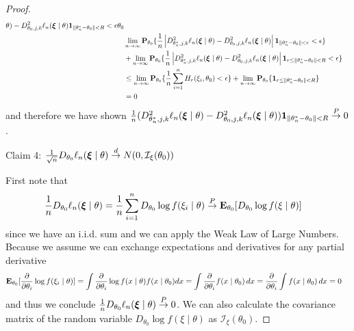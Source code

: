 \begin{proof}
\begin{align*}
{{\theta) - D^2_{\theta_0, j,k} \ell_n(\sample{\xi} \mid
\theta) } \characteristic{\norm{\theta^*_n - \theta_0} < R} <
\epsilon}{\theta_0} \\
&\lim_{n \to \infty} \sprobability{\frac{1}{n}\abs{D^2_{\theta^*_n, j,k} \ell_n(\sample{\xi} \mid
\theta) - D^2_{\theta_0, j,k} \ell_n(\sample{\xi} \mid
\theta) } \characteristic{\norm{\theta^*_n - \theta_0} < r} <
\epsilon}{\theta_0} \\
&+ \lim_{n \to \infty} \sprobability{\frac{1}{n}\abs{D^2_{\theta^*_n, j,k} \ell_n(\sample{\xi} \mid
\theta) - D^2_{\theta_0, j,k} \ell_n(\sample{\xi} \mid
\theta) } \characteristic{r \leq \norm{\theta^*_n - \theta_0} < R} <
\epsilon}{\theta_0} \\
&\leq
\lim_{n \to \infty} \sprobability{\frac{1}{n} \sum_{i=1}^n H_r(\xi_i,
  \theta_0) < \epsilon}{\theta_0} + 
\lim_{n \to \infty} \sprobability{ \characteristic{r \leq \norm{\theta^*_n -
      \theta_0} < R} }{\theta_0} \\
&= 0
\end{align*}
and therefore we have shown $\frac{1}{n} (D^2_{\theta^*_n, j,k} \ell_n(\sample{\xi} \mid
\theta) - D^2_{\theta_0, j,k} \ell_n(\sample{\xi} \mid
\theta) ) \characteristic{\norm{\theta^*_n - \theta_0} < R} \toprob 0$.

Claim 4: $ \frac{1}{\sqrt{n}} D_{\theta_0} \ell_n(\sample{\xi}
\mid \theta) \todist N(0, \mathcal{I}_\xi(\theta_0))$

First note that 
\begin{align*}
\frac{1}{n} D_{\theta_0} \ell_n(\sample{\xi}
\mid \theta) &= \frac{1}{n} \sum_{i=1}^n D_{\theta_0} \log f(\xi_i
\mid \theta) \toprob \sexpectation{D_{\theta_0} \log f(\xi \mid \theta)}{\theta_0}
\end{align*}
since we have an i.i.d. sum and we can apply the Weak Law of Large
Numbers.  Because we assume we can exchange expectations and
derivatives for any partial derivative 
\begin{align*}
\sexpectation{\frac{\partial}{\partial \theta_i} \log f(\xi_i \mid
  \theta)}{\theta_0} &= \int \frac{\partial}{\partial \theta_i} \log f(x \mid
  \theta) f(x \mid \theta_0) dx = \int \frac{\partial}{\partial \theta_i}  f(x \mid
  \theta_0) \, dx = \frac{\partial}{\partial \theta_i} \int f(x \mid
  \theta_0) \, dx = 0
\end{align*}
and thus we conclude $\frac{1}{n} D_{\theta_0} \ell_n(\sample{\xi}
\mid \theta) \toprob 0$.  We can also calculate the covariance matrix of the random variable
$D_{\theta_0} \log f(\xi \mid \theta)$ as $\mathcal{I}_\xi(\theta_0)$.


\end{proof}
